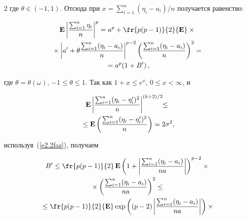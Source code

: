 \begin{multicols}{2}
где $\theta\in (-1, 1)$. Отсюда при $x={


\sum\limits_{i=1}^n(\eta_i-a_i)}/{n}$ получается равенство:


\begin{multline*}


{\E}\left|\frac{ \sum_{i=1}^n\eta_i}{n}\right|^p=a^p +


\fr{p(p-1)}{2}{\E}\times{}\\


{}\times \left|


a'+\theta\frac{


\sum_{i=1}^n(\eta_i-a_i)}{n}\right|^{p-2}\left(\frac{


\sum_{i=1}^n(\eta_i-a_i)}{n}\right)^2={}\\


{}=a^p(1+B')\,,


\end{multline*}


где $\theta=\theta(\omega)$, $-1\le\theta\le 1$. Так как $1+x\le


e^x$, $0\le x<\infty$, и


\begin{multline*}


{\E}\left|\frac{


\sum_{i=1}^n(\eta_i-\eta'_i)^2}{n}\right|^{(k+2)/2}\!\!\le{}\\


{}\le {\E}\left(\frac{


\sum_{i=1}^n(\eta_i-\eta'_i)^2}{n}\right)=2\sigma^2,


\end{multline*}


используя~(\ref{e2.2faz}), получаем


\begin{multline*}


B'\le\fr{p(p-1)}{2}\,{\E}\left(1+\left|\frac{


\sum_{i=1}^n(\eta_i-a_i)}{na}\right|\right)^{p-2}\times{}\\


{}\times 


\left(\frac{


\sum_{i=1}^n(\eta_i-a_i)}{na}\right)^2\le{}\\


{}\le\fr{p(p-1)}{2}{\E}\exp\left((p-2)\left|\frac{


\sum_{i=1}^n(\eta_i-a_i)}{na}\right|\right)\times{}


\end{multline*}



\end{multicols}
